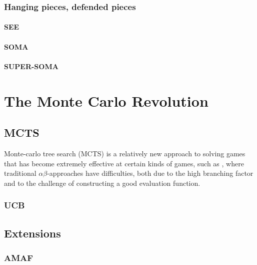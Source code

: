 \documentclass[10pt,dvipdfmx]{report}
\newcommand{\ab}{{$\alpha\beta$}}
\newcommand{\g}[1]{{\sc{#1}}\index{{\sc{#1}}}}
\begin{document}
\section{Hanging pieces, defended pieces}

\subsection{SEE}
\subsection{SOMA}
\subsection{SUPER-SOMA}

\part{The Monte Carlo Revolution}

\chapter{MCTS}
\label{chap-mcts}

Monte-carlo tree search (MCTS) is a relatively new approach to solving
games that has become extremely effective at certain kinds of games, such
as \g{go}, where traditional \ab-approaches have difficulties, both
due to the high branching factor and to the challenge of constructing a good
evaluation function.

\section{UCB}


\chapter{Extensions}
\label{chap-mcts-extensions}

\section{AMAF}
\end{document}
